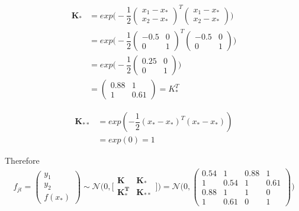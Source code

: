 \documentclass[11pt]{article}
\begin{document}
\begin{align*}
	\boldsymbol{K_*} &= exp\big(-\dfrac{1}{2}
	\begin{pmatrix}
		x_1 - x_* \\
		x_2 - x_*
	\end{pmatrix}^T 
	\begin{pmatrix}
		x_1 - x_* \\
		x_2 - x_*
	\end{pmatrix}
	\big)\\	
	&= exp\big(-\dfrac{1}{2}
	\begin{pmatrix}
		-0.5 & 0\\
		0 & 1
	\end{pmatrix}^T 
	\begin{pmatrix}
		-0.5 & 0\\
		0 & 1
	\end{pmatrix}
	\big)\\	
	&= exp\big(-\dfrac{1}{2}
	\begin{pmatrix}
		0.25 & 0 \\
		0 & 1
	\end{pmatrix}
	\big)\\	
	&=
	\begin{pmatrix}
		0.88 & 1 \\
		1 & 0.61
	\end{pmatrix} = K^T_*
\end{align*}

\begin{align*}
	\boldsymbol{K_{**}} &= exp(-\dfrac{1}{2} (x_* - x_*)^T (x_* - x_*)) \\
		   &= exp(0) = 1
\end{align*}

Therefore
\begin{align*}
	f_{jt} =
	\begin{pmatrix}
		y_1\\
		y_2\\
		f(x_*)
	\end{pmatrix}
	\sim \mathcal N \Big(0, \Big[
	\begin{matrix}
		\boldsymbol{K} & \boldsymbol{K_*} \\
		\boldsymbol{K_*^T} & \boldsymbol{K_{**}}
	\end{matrix}
	\Big]\Big)
	= \mathcal N \Big(0,
	\begin{pmatrix}
		0.54 & 1 & 0.88 & 1\\
		1 & 0.54 & 1 & 0.61\\		
		0.88 & 1 & 1 & 0\\
		1 & 0.61 & 0 & 1
	\end{pmatrix}
	\Big)
\end{align*}
\end{document}
